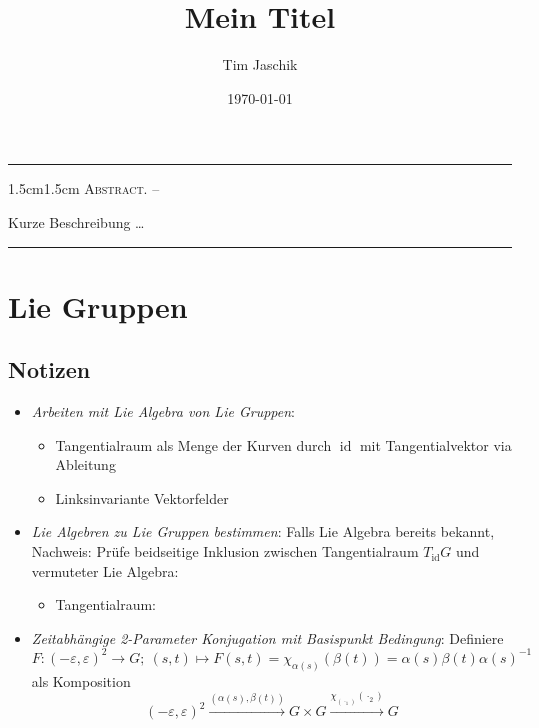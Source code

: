 \documentclass[10pt, letterpaper]{article}
\title{Mein Titel}
\author{Tim Jaschik}
\date{\today}
\newcommand{\id}{\operatorname{id}}
\renewenvironment{abstract}
  {
    \begin{adjustwidth}{1.5cm}{1.5cm}
    \small
    \textsc{Abstract. –}%
  }
  {
    \end{adjustwidth}
  }
\begin{document}
\maketitle
\rule{\textwidth}{0.5pt}
\begin{abstract}
Kurze Beschreibung …
\end{abstract}
\rule{\textwidth}{0.5pt}
\vspace{0.5cm}

\tableofcontents

\pagebreak



\section{Lie Gruppen}

\subsection{Notizen}

\begin{itemize}
    \item \emph{Arbeiten mit Lie Algebra von Lie Gruppen}: 
    \begin{itemize}
        \item Tangentialraum als Menge der Kurven durch $\id$ mit Tangentialvektor via Ableitung
        \item Linksinvariante Vektorfelder
    \end{itemize}
    \item \emph{Lie Algebren zu Lie Gruppen bestimmen}: Falls Lie Algebra bereits bekannt, Nachweis: Prüfe beidseitige Inklusion zwischen Tangentialraum $T_{\id}G$ und vermuteter Lie Algebra:
    \begin{itemize}
        \item Tangentialraum: 
    \end{itemize}  
    \item \emph{Zeitabhängige 2-Parameter Konjugation mit Basispunkt Bedingung}: Definiere 
    $$F: (-\varepsilon,\varepsilon)^2\to G;\ (s,t)\mapsto F(s,t)=\chi_{\alpha(s)}(\beta(t))=\alpha(s)\beta(t)\alpha(s)^{-1}$$
    als Komposition
    $$(-\varepsilon,\varepsilon)^2 \overset{(\alpha(s),\beta(t))}{\to} G \times G \overset{\chi_{(\cdot_1)}(\cdot_2)}{\to} G$$
\end{itemize}





\pagebreak
\printbibliography
\end{document}
